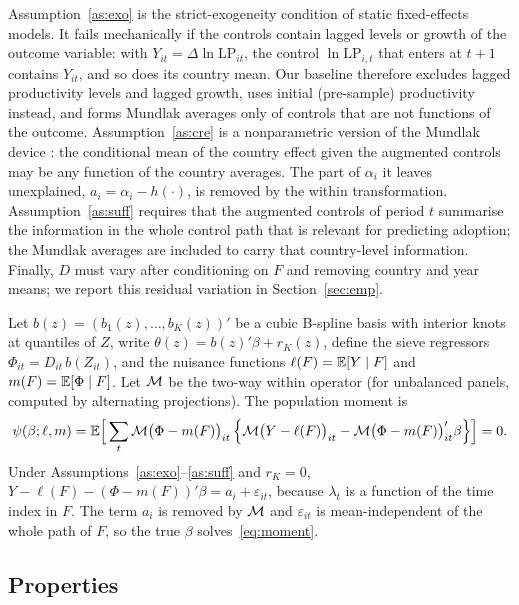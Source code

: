 \documentclass[preprint,12pt,authoryear]{elsarticle}
\begin{document}
Assumption~\ref{as:exo} is the strict-exogeneity condition of static fixed-effects models. It fails mechanically if the controls contain lagged levels or growth of the outcome variable: with $Y_{it}=\Delta\ln \mathrm{LP}_{it}$, the control $\ln \mathrm{LP}_{i,t}$ that enters at $t+1$ contains $Y_{it}$, and so does its country mean. Our baseline therefore excludes lagged productivity levels and lagged growth, uses initial (pre-sample) productivity instead, and forms Mundlak averages only of controls that are not functions of the outcome. Assumption~\ref{as:cre} is a nonparametric version of the Mundlak device \citep{mundlak1978,wooldridge2010}: the conditional mean of the country effect given the augmented controls may be any function of the country averages. The part of $\alpha_i$ it leaves unexplained, $a_i=\alpha_i-h(\cdot)$, is removed by the within transformation. Assumption~\ref{as:suff} requires that the augmented controls of period $t$ summarise the information in the whole control path that is relevant for predicting adoption; the Mundlak averages are included to carry that country-level information. Finally, $D$ must vary after conditioning on $F$ and removing country and year means; we report this residual variation in Section~\ref{sec:emp}.

Let $b(z)=(b_1(z),\dots,b_K(z))'$ be a cubic B-spline basis with interior knots at quantiles of $Z$, write $\theta(z)=b(z)'\beta+r_K(z)$, define the sieve regressors $\Phi_{it}=D_{it}\,b(Z_{it})$, and the nuisance functions $\ell(F)=\mathbb{E}[Y\mid F]$ and $m(F)=\mathbb{E}[\Phi\mid F]$. Let $\mathcal{M}$ be the two-way within operator (for unbalanced panels, computed by alternating projections). The population moment is
\begin{equation}
\psi(\beta;\ell,m)=\mathbb{E}\Big[\sum_t \mathcal{M}\big(\Phi-m(F)\big)_{it}\,\Big\{\mathcal{M}\big(Y-\ell(F)\big)_{it}-\mathcal{M}\big(\Phi-m(F)\big)_{it}'\beta\Big\}\Big]=0 .
\label{eq:moment}
\end{equation}
Under Assumptions~\ref{as:exo}--\ref{as:suff} and $r_K=0$, $Y-\ell(F)-(\Phi-m(F))'\beta=a_i+\varepsilon_{it}$, because $\lambda_t$ is a function of the time index in $F$. The term $a_i$ is removed by $\mathcal{M}$ and $\varepsilon_{it}$ is mean-independent of the whole path of $F$, so the true $\beta$ solves~\eqref{eq:moment}.

\subsection{Properties}
\end{document}
